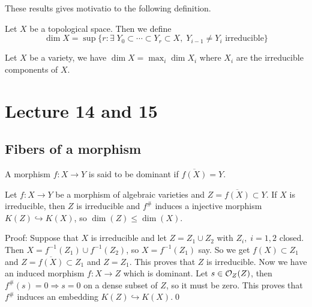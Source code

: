 These results gives motivatio to the following definition. 
\begin{dang}
\begin{definition}
    Let $X$ be a topological space. Then we define 
    \begin{equation}
        \dim X = \sup\{r: \exists\;Y_0\subset\cdots\subset Y_r\subset X,\;Y_{i-1}\neq Y_i\text{ irreducible}\}
    \end{equation}
\end{definition}
\end{dang}
\begin{dang}
\begin{proposition}
    Let $X$ be a variety, we have $\dim X = \max_i\dim X_i$ 
    where $X_i$ are the irreducible components of $X$.
\end{proposition}
\end{dang}

\section{Lecture 14 and 15}
\subsection{Fibers of a morphism}
\begin{dang}
    \begin{definition}
        A morphism $f:X\to Y$ is said to be dominant if $\overline{f(X)}=Y$.
    \end{definition}
\end{dang}
\begin{dang}
    \begin{proposition}
        Let $f:X\to Y$ be a morphism of algebraic varieties and $Z=\overline{f(X)}\subset Y$. If 
        $X$ is irreducible, then $Z$ is irreducible and $f^\#$ induces a injective morphism 
        $K(Z)\hookrightarrow K(X)$, so $\dim(Z)\leq \dim(X)$.
    \end{proposition}
\end{dang}
Proof: Suppose that $X$ is irreducible and let $Z=Z_1\cup Z_2$ with $Z_i,\;i=1,2$ closed. Then 
$X=f^{-1}(Z_1)\cup f^{-1}(Z_2)$, so $X=f^{-1}(Z_1)$ say. So we get 
$f(X)\subset Z_1$ and $Z=\overline{f(X)}\subset Z_1$ and $Z=Z_1$. This proves that $Z$ is irreducible. Now we have 
an induced morphism $f:X\to Z$ which is dominant. Let $s\in\mathcal{O}_Z(Z)$, then 
$f^\#(s)=0\Rightarrow s=0$ on a dense subset of $Z$, so it must be zero. This proves that 
$f^\#$ induces an embedding $K(Z)\hookrightarrow K(X)$.\qed 

